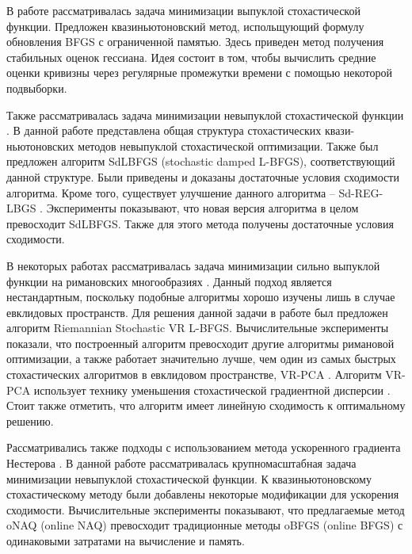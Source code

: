 \documentclass[]{scrartcl}
\begin{document}
В работе \cite{journals/siamjo/ByrdHNS16} рассматривалась задача минимизации выпуклой стохастической функции. Предложен квазиньютоновский метод, испольщующий формулу обновления BFGS с ограниченной памятью. Здесь приведен метод получения стабильных оценок гессиана. Идея состоит в том, чтобы вычислить средние оценки кривизны через регулярные промежутки времени с помощью некоторой подвыборки.


Также рассматривалась задача минимизации невыпуклой стохастической функции \cite{journals/siamjo/WangMGL17}. В данной работе представлена общая структура стохастических квази-ньютоновских методов невыпуклой стохастической оптимизации. Также был предложен алгоритм SdLBFGS (stochastic damped L-BFGS), соответствующий данной структуре. Были приведены и доказаны достаточные условия сходимости алгоритма. Кроме того, существует улучшение данного алгоритма -- Sd-REG-LBGS \cite{journals/corr/abs-1912-04456}. Эксперименты показывают, что новая версия алгоритма в целом превосходит SdLBFGS. Также для этого метода получены достаточные условия сходимости.

В некоторых работах рассматривалась задача минимизации сильно выпуклой функции на римановских многообразиях \cite{journals/corr/RoychowdhuryP17}. Данный подход является нестандартным, поскольку подобные алгоритмы хорошо изучены лишь в случае евклидовых пространств. Для решения данной задачи в работе был предложен алгоритм Riemannian Stochastic VR L-BFGS. Вычислительные эксперименты показали, что построенный алгоритм превосходит другие алгоритмы римановой оптимизации, а также работает значительно лучше, чем один из самых быстрых стохастических алгоритмов в евклидовом пространстве, VR-PCA \cite{journals/corr/Shamir14b}. Алгоритм VR-PCA использует технику уменьшения стохастической градиентной дисперсии \cite{oai:repository.ust.hk:1783.1-98257}.  Стоит также  отметить, что алгоритм имеет линейную сходимость к оптимальному решению. 

Рассматривались также подходы с использованием метода ускоренного градиента Нестерова \cite{journals/corr/abs-1909-03621}. В данной работе рассматривалась крупномасштабная задача минимизации невыпуклой стохастической функции. К квазиньютоновскому стохастическому методу были добавлены некоторые модификации для ускорения сходимости. Вычислительные эксперименты показывают, что предлагаемые метод oNAQ (online NAQ)  превосходит традиционные методы oBFGS (online BFGS) \cite{journals/jmlr/SchraudolphYG07} с одинаковыми затратами на вычисление и память.
\end{document}
